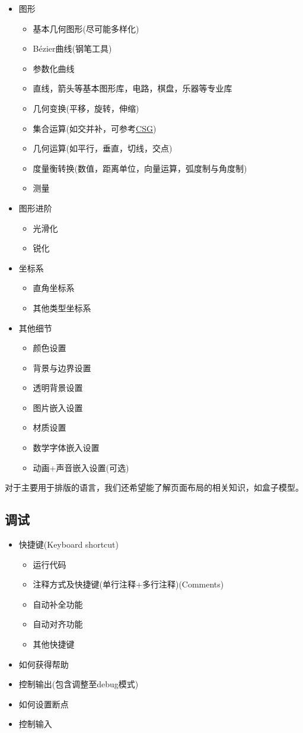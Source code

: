 \documentclass[11pt]{amsart}
\begin{document}
\begin{itemize}
\item 图形
\begin{itemize}
	\item 基本几何图形(尽可能多样化)
	\item Bézier曲线(钢笔工具)
	\item 参数化曲线
	\item 直线，箭头等基本图形库，电路，棋盘，乐器等专业库
	\item 几何变换(平移，旋转，伸缩)
	\item 集合运算(如交并补，可参考\href{https://en.wikipedia.org/wiki/Constructive_solid_geometry}{CSG})
	\item 几何运算(如平行，垂直，切线，交点)
	\item 度量衡转换(数值，距离单位，向量运算，弧度制与角度制)
	\item 测量
\end{itemize}
\item 图形进阶
\begin{itemize}
	\item 光滑化
	\item 锐化
\end{itemize}
\item 坐标系
\begin{itemize}
	\item 直角坐标系
	\item 其他类型坐标系
\end{itemize}
\item 其他细节
\begin{itemize}
	\item 颜色设置
	\item 背景与边界设置
	\item 透明背景设置
	\item 图片嵌入设置
	\item 材质设置
	\item 数学字体嵌入设置
	\item 动画+声音嵌入设置(可选)
\end{itemize}
\end{itemize}
对于主要用于排版的语言，我们还希望能了解页面布局的相关知识，如盒子模型。
\subsection{调试}
\begin{itemize}
	\item 快捷键(Keyboard shortcut)
	\begin{itemize}
		\item 运行代码
		\item 注释方式及快捷键(单行注释+多行注释)(Comments)
		\item 自动补全功能
    	\item 自动对齐功能
		\item 其他快捷键	
	\end{itemize}
	\item 如何获得帮助
	\item 控制输出(包含调整至debug模式)	
	\item 如何设置断点
	\item 控制输入


\end{itemize}
\end{document}
